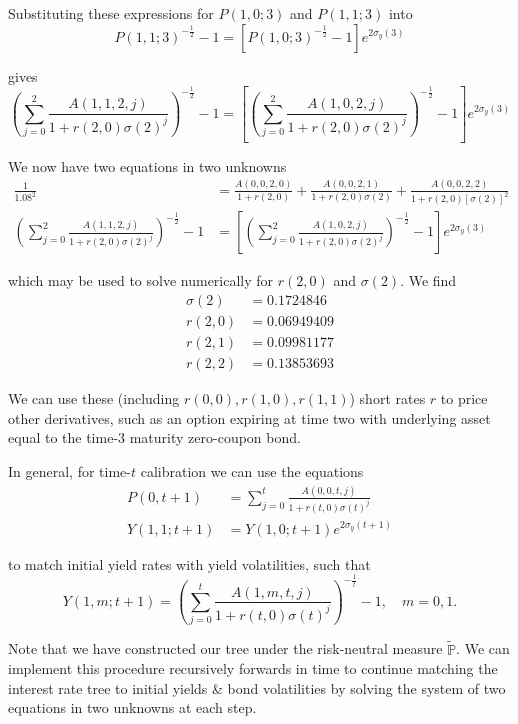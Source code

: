 \documentclass[12pt]{article}
\newlength\tindent
\renewcommand{\indent}{\hspace*{\tindent}}
\renewcommand{\P}{\mathbb P}
\begin{document}
Substituting these expressions for $P(1,0;3)$ and $P(1,1;3)$ into
\begin{equation*}
	P(1,1;3)^{-\frac{1}{2}} - 1 = \left[ P(1,0;3)^{-\frac{1}{2}} - 1\right] e^{2\sigma_y(3)}
\end{equation*}

gives
\begin{equation*}
	\left( \sum^2_{j = 0} \frac{ A(1,1,2,j) }{ 1 + r(2,0)\sigma(2)^j } \right)^{-\frac{1}{2}} - 1 = \left[ \left( \sum^2_{j = 0} \frac{ A(1,0,2,j) }{ 1 + r(2,0)\sigma(2)^j } \right) ^{-\frac{1}{2}} - 1\right] e^{2\sigma_y(3)}
\end{equation*}

We now have two equations in two unknowns 
\begin{align*}
	\frac{1}{1.08^2} &= \frac{ A(0,0,2,0) }{ 1 + r(2,0) } + \frac{ A(0,0,2,1) }{ 1 + r(2,0)\sigma(2) } + \frac{ A(0,0,2,2) }{ 1 + r(2,0)[\sigma(2)]^2 } \\
	\left( \sum^2_{j = 0} \frac{ A(1,1,2,j) }{ 1 + r(2,0)\sigma(2)^j } \right)^{-\frac{1}{2}} - 1 &= \left[ \left( \sum^2_{j = 0} \frac{ A(1,0,2,j) }{ 1 + r(2,0)\sigma(2)^j } \right) ^{-\frac{1}{2}} - 1\right] e^{2\sigma_y(3)}
\end{align*}

which may be used to solve numerically for $r(2,0)$ and $\sigma(2)$. We find
\begin{align*}
	\sigma(2) &= 0.1724846 \\
	r(2,0) &= 0.06949409 \\
	r(2,1) &= 0.09981177 \\
	r(2,2) &= 0.13853693
\end{align*}

\indent We can use these (including $r(0,0), r(1,0), r(1,1)$) short rates $r$ to price other derivatives, such as an option expiring at time two with underlying asset equal to the time-3 maturity zero-coupon bond.

In general, for time-$t$ calibration we can use the equations
\begin{align*}
	P(0,t + 1) &= \sum^t_{j = 0} \frac{ A(0,0,t,j) }{ 1 + r(t,0)\sigma(t)^j } \\
	Y(1,1; t + 1) &= Y(1,0;t + 1)e^{2\sigma_y(t + 1)}
\end{align*}

to match initial yield rates with yield volatilities, such that
\begin{equation*}
	Y(1,m; t + 1) = \left( \sum^t_{j = 0} \frac{ A(1,m,t,j) }{ 1 + r(t,0)\sigma(t)^j } \right)^{-\frac{1}{t}} - 1, \quad m = 0,1.
\end{equation*}

\indent Note that we have constructed our tree under the risk-neutral measure $\tilde{\P}$. We can implement this procedure recursively forwards in time to continue matching the interest rate tree to initial yields \& bond volatilities by solving the system of two equations in two unknowns at each step. \\
\end{document}
